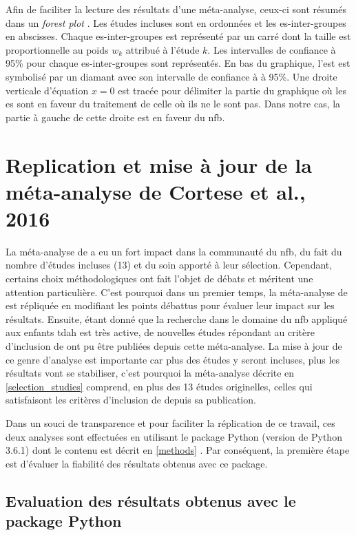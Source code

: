 Afin de faciliter la lecture des résultats d'une méta-analyse, ceux-ci sont résumés dans un \textit{forest plot} \citep[Chapitre~1]{Borenstein2009}. Les études incluses sont
en ordonnées et les \gls{es}-inter-groupes en abscisses. Chaque \gls{es}-inter-groupes est représenté par un carré dont la taille est proportionnelle
au poids $w_k$ attribué à l'étude $k$. Les intervalles de confiance à 95\% pour chaque \gls{es}-inter-groupes sont représentés. En bas du graphique, l'\gls{est}
est symbolisé par un diamant avec son intervalle de confiance à à 95\%. Une droite verticale d'équation $x = 0$ est tracée pour délimiter la
partie du graphique où les \gls{es} sont en faveur du traitement de celle où ils ne le sont pas. Dans notre cas, la partie à gauche de cette droite
est en faveur du \gls{nfb}.

\section{Replication et mise à jour de la méta-analyse de Cortese et al., 2016} 

La méta-analyse de \citet{Cortese2016} a eu un fort impact dans la communauté du \gls{nfb}, du fait du nombre d'études incluses (13) et 
du soin apporté à leur sélection. Cependant, certains choix méthodologiques ont fait l'objet de débats \citep{Micoulaud2016} et
méritent une attention particulière.
C'est pourquoi dans un premier temps, la méta-analyse de \citet{Cortese2016} est répliquée en modifiant les points débattus pour évaluer leur impact sur les
résultats. Ensuite, étant donné que la recherche dans le domaine du \gls{nfb} appliqué aux enfants \gls{tdah} est très active, de nouvelles études répondant au 
critère d'inclusion de \citet{Cortese2016} ont pu être publiées depuis cette méta-analyse. La mise à jour de ce genre d'analyse est importante
car plus des études y seront incluses, plus les résultats vont se stabiliser, c'est pourquoi la méta-analyse décrite en \ref{selection_studies}
comprend, en plus des 13 études originelles, celles qui
satisfaisont les critères d'inclusion de \citet{Cortese2016} depuis sa publication.

Dans un souci de transparence et pour faciliter la réplication de ce travail, ces deux analyses sont effectuées en utilisant le package Python 
(version de Python 3.6.1) dont le contenu est décrit en \ref{methods} \citep{Bussalb2019c}. Par conséquent, la première étape est d'évaluer la
fiabilité des résultats obtenus avec ce package.

\subsection{Evaluation des résultats obtenus avec le package Python} 

